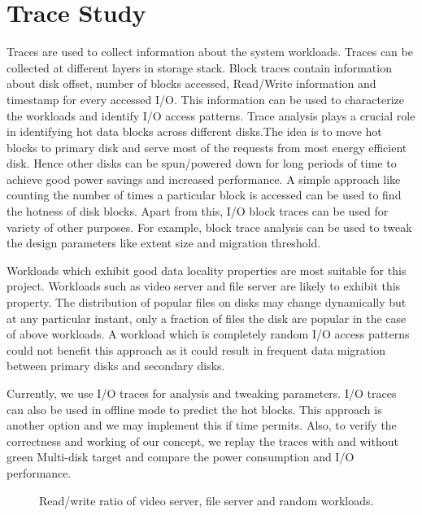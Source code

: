 \section{Trace Study}
\label{sec:trace}

Traces are used to collect information about the system workloads.
Traces can be collected at different layers in storage stack. Block
traces contain information about disk offset, number of blocks
accessed, Read/Write information and timestamp for every accessed I/O.
This information can be used to characterize the workloads and
identify I/O access patterns.  Trace analysis plays a crucial role in
identifying hot data blocks across different disks.The idea is to move
hot blocks to primary disk and serve most of the requests from most
energy efficient disk. Hence other disks can be spun/powered down for
long periods of time to achieve good power savings and increased
performance. A simple approach like counting the number of times a
particular block is accessed can be used to find the hotness of disk
blocks. Apart from this, I/O block traces can be used for variety of
other purposes.  For example, block trace analysis can be used to
tweak the design parameters like extent size and migration threshold.

Workloads which exhibit good data locality properties are most
suitable for this project. Workloads such as video server and file
server are likely to exhibit this property. The distribution of
popular files on disks may change dynamically but at any particular
instant, only a fraction of files the disk are popular in the case of
above workloads. A workload which is completely random I/O access
patterns could not benefit this approach as it could result in
frequent data migration between primary disks and secondary disks.
 
Currently, we use I/O traces for analysis and tweaking parameters. I/O
traces can also be used in offline mode to predict the hot blocks.
This approach is another option and we may implement this if time
permits. Also, to verify the correctness and working of our concept,
we replay the traces with and without green Multi-disk target and
compare the power consumption and I/O performance. 

\begin{figure}[ht]
\begin{centering}
\caption{Read/write ratio of video server, file server and random
  workloads.}
\label{fig:rwratio}
\end{centering}
\end{figure}

